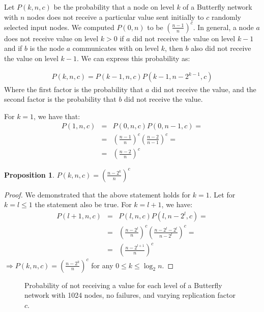 \documentclass[11pt,twocolumn]{MyTightStyle}
\theoremstyle{plain}
\newtheorem{prop}[thm]{Proposition}
\theoremstyle{definition}
\theoremstyle{remark}
\numberwithin{equation}{section}
\begin{document}
  Let $P(k,n,c)$ be the probability that a node on level $k$ of a
  Butterfly network with $n$ nodes does not
  receive a particular value sent initially to $c$ randomly selected
  input nodes. We computed $P(0,n)$ to be $(\frac{n-1}{n})^c$. In
  general, a node $a$ does not receive value on level $k  > 0$ if $a$
  did not receive the value on level $k-1$ and if $b$ is the node $a$
  communicates with on level $k$, then $b$ also did not receive the
  value on level $k-1$. We can express this probability as: 

  \begin{eqnarray*}
    P(k,n,c) = P(k-1,n,c)P(k-1, n-2^{k-1},c)
  \end{eqnarray*}
  Where the first factor is the probability that $a$ did not receive
  the value, and the second factor is the probability that $b$ did not
  receive the value.

  For $k =1$, we have that:
  \begin{eqnarray*}
    P(1, n,c) &=& P(0, n,c)P(0, n-1,c) = \\
    &=&(\frac{n-1}{n})^c(\frac{n-2}{n-1})^c=\\
    &=&(\frac{n-2}{n})^c
  \end{eqnarray*}

  \begin{prop}
    $P(k,n,c) = (\frac{n-2^k}{n})^c$
  \end{prop}

  \begin{proof}
    We demonstrated that the above statement holds for $k=1$. Let
    for $k=l \leq 1$ the statement also be true. For $k=l+1$, we have:
    \begin{eqnarray*}
      P(l+1,n,c) &=& P(l,n,c)P(l, n-2^{l},c) = \\
      &=& (\frac{n-2^l}{n})^c(\frac{n-2^{l}-2^{l}}{n-2^l})^c =\\
      &=& (\frac{n-2^{l+1}}{n})^c
    \end{eqnarray*}
    $\Rightarrow P(k,n,c) = (\frac{n-2^k}{n})^c$ for any $0 \leq k
    \leq \log_2n$. 
  \end{proof}

  \begin{figure}
    \begin{center}
      \caption{\footnotesize Probability of not receiving a value for
      each level of a Butterfly network with 1024 nodes, no failures, and varying
      replication factor $c$.}
      \label{test}
    \end{center}
  \end{figure}
\end{document}
